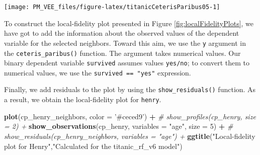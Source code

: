 \documentclass[12pt,]{krantz}
\newenvironment{Shaded}{\begin{snugshade}}{\end{snugshade}}
\newcommand{\CommentTok}[1]{\textcolor[rgb]{0.56,0.35,0.01}{\textit{#1}}}
\newcommand{\DataTypeTok}[1]{\textcolor[rgb]{0.13,0.29,0.53}{#1}}
\newcommand{\DecValTok}[1]{\textcolor[rgb]{0.00,0.00,0.81}{#1}}
\newcommand{\FloatTok}[1]{\textcolor[rgb]{0.00,0.00,0.81}{#1}}
\newcommand{\KeywordTok}[1]{\textcolor[rgb]{0.13,0.29,0.53}{\textbf{#1}}}
\newcommand{\NormalTok}[1]{#1}
\newcommand{\OperatorTok}[1]{\textcolor[rgb]{0.81,0.36,0.00}{\textbf{#1}}}
\newcommand{\StringTok}[1]{\textcolor[rgb]{0.31,0.60,0.02}{#1}}
\theoremstyle{definition}
\theoremstyle{definition}
\theoremstyle{definition}
\theoremstyle{remark}
\begin{document}
\begin{center}\texttt{[image: PM\_VEE\_files/figure-latex/titanicCeterisParibus05-1]} \end{center}

To construct the local-fidelity plot presented in Figure
\ref{fig:localFidelityPlots}, we have got to add the information about
the observed values of the dependent variable for the selected
neighbors. Toward this aim, we use the \texttt{y} argument in the
\texttt{ceteris\_paribus()} function. The argument takes numerical
values. Our binary dependent variable \texttt{survived} assumes values
\texttt{yes/no}; to convert them to numerical values, we use the
\texttt{survived\ ==\ "yes"} expression.

\begin{Shaded}
\end{Shaded}

Finally, we add residuals to the plot by using the
\texttt{show\_residuals()} function. As a result, we obtain the
local-fidelity plot for \texttt{henry}.

\begin{Shaded}
\begin{Highlighting}[]
\KeywordTok{plot}\NormalTok{(cp_henry_neighbors, }\DataTypeTok{color =} \StringTok{'#ceced9'}\NormalTok{) }\OperatorTok{+}
\CommentTok{#  show_profiles(cp_henry, size = 2) + }
\StringTok{  }\KeywordTok{show_observations}\NormalTok{(cp_henry, }\DataTypeTok{variables =} \StringTok{"age"}\NormalTok{, }\DataTypeTok{size =} \DecValTok{5}\NormalTok{) }\OperatorTok{+}
\CommentTok{#  show_residuals(cp_henry_neighbors, variables = "age") +}
\StringTok{  }\KeywordTok{ggtitle}\NormalTok{(}\StringTok{"Local-fidelity plot for Henry"}\NormalTok{,}\StringTok{"Calculated for the titanic_rf_v6 model"}\NormalTok{)}
\end{Highlighting}
\end{Shaded}
\end{document}
